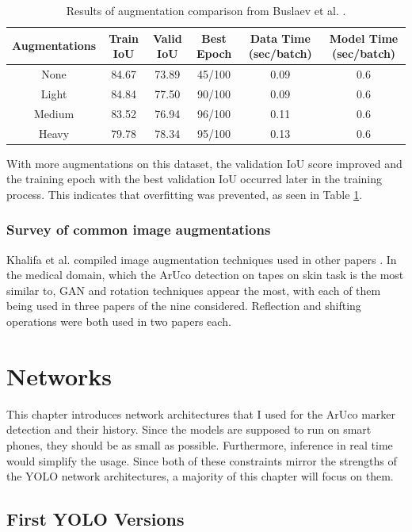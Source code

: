\documentclass[10pt]{book}
\begin{document}
\begin{table}
  \begin{tabular}{ c c c c c c }
   Augmentations & Train IoU & Valid IoU & Best Epoch & Data Time (sec/batch) & Model Time (sec/batch) \\ 
   \hline
   None & 84.67 & 73.89 & 45/100 & 0.09 & 0.6\\
   Light & 84.84 & 77.50 & 90/100 & 0.09 & 0.6\\
   Medium & 83.52 & 76.94 & 96/100 & 0.11 & 0.6\\
   Heavy & 79.78 & 78.34 & 95/100 & 0.13 & 0.6\\
   \hline
  \end{tabular}
  \caption{\label{tab:alb-iou}Results of augmentation comparison from Buslaev et al. \cite{info11020125}.}
\end{table}

With more augmentations on this dataset, the validation \ac{IoU} score improved and the training epoch with the best validation \ac{IoU} occurred later in the training process. This indicates that overfitting was prevented, as seen in Table \ref{tab:alb-iou}.

\subsection{Survey of common image augmentations}

Khalifa et al. compiled image augmentation techniques used in other papers \cite{khalifa2022comprehensive}. In the medical domain, which the \ac{ArUco} detection on tapes on skin task is the most similar to, \ac{GAN} and rotation techniques appear the most, with each of them being used in three papers of the nine considered. Reflection and shifting operations were both used in two papers each.

\chapter{Networks}
\label{chap:netw}

This chapter introduces network architectures that I used for the \ac{ArUco} marker detection and their history. Since the models are supposed to run on smart phones, they should be as small as possible. Furthermore, inference in real time would simplify the usage. Since both of these constraints mirror the strengths of the \ac{YOLO} network architectures, a majority of this chapter will focus on them.

\section{First YOLO Versions}
\end{document}
